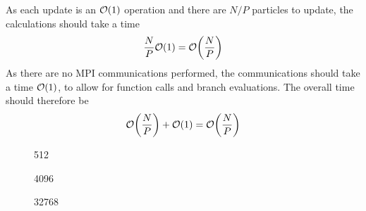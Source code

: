 %
As each update is an $\mathcal{O}{\left({ 1 }\right)}$ operation and there are $N/P$ particles
to update,
the calculations should take a time
\begin{equation}
    \frac{N}{P}\mathcal{O}{\left({ 1 }\right)} = \mathcal{O}{\left({ \frac{N}{P} }\right)}
\end  {equation}
%
As there are no MPI communications performed, the communications should
take a time $\mathcal{O}{\left({ 1 }\right)}$, to allow for function calls and branch evaluations.
%
The overall time should therefore be
\begin{equation}
    \mathcal{O}{\left({ \frac{N}{P} }\right)} + \mathcal{O}{\left({ 1 }\right)} = \mathcal{O}{\left({ \frac{N}{P} }\right)}
\end{equation}


%
%
\begin{figure}[!h]
    
    \caption{
        \vZeroTimeCaption
            {\systolicloop{}}
            {\individualoperation{}}
            {512}
    }
    \label{fig:v0_systolic_individual_operation_512_logtime}
\end  {figure}

\begin{figure}[!h]
    
    \caption{
        \vZeroTimeCaption
            {\systolicloop{}}
            {\individualoperation{}}
            {4096}
    }
    \label{fig:v0_systolic_individual_operation_4096_logtime}
\end  {figure}

\begin{figure}[!h]
    
    \caption{
        \vZeroTimeCaption
            {\systolicloop{}}
            {\individualoperation{}}
            {32768}
    }
    \label{fig:v0_systolic_individual_operation_32768_logtime}
\end  {figure}

\vZeroTimeExplanation
    {}
    {}
    {}
    {\individualoperation{}}
    {\systolicloop{}}


